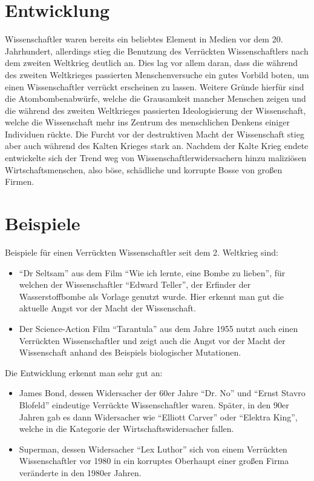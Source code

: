 \documentclass[12pt]{scrreprt}
\begin{document}
{\section{Entwicklung}
	\label{sec:entwicklung}
Wissenschaftler waren bereits ein beliebtes Element in Medien vor dem 20. Jahrhundert, allerdings stieg die Benutzung des Verrückten Wissenschaftlers nach dem zweiten Weltkrieg deutlich an.
Dies lag vor allem daran, dass die während des zweiten Weltkrieges passierten Menschenversuche ein gutes Vorbild boten, um einen Wissenschaftler verrückt erscheinen zu lassen.
Weitere Gründe hierfür sind die Atombombenabwürfe, welche die Grausamkeit mancher Menschen zeigen und die während des zweiten Weltkrieges passierten Ideologisierung der Wissenschaft, welche die Wissenschaft mehr ins Zentrum des menschlichen Denkens einiger Individuen rückte.
Die Furcht vor der destruktiven Macht der Wissenschaft stieg aber auch während des Kalten Krieges stark an.
Nachdem der Kalte Krieg endete entwickelte sich der Trend weg von Wissenschaftlerwidersachern hinzu maliziösen Wirtschaftsmenschen, also böse, schädliche und korrupte Bosse von großen Firmen.
\section{Beispiele}
	\label{sec:beispiele}
Beispiele für einen Verrückten Wissenschaftler seit dem 2. Weltkrieg sind:
\begin{itemize}
	\item \enquote{Dr Seltsam} aus dem Film \enquote{Wie ich lernte, eine Bombe zu lieben}, für welchen der Wissenschaftler \enquote{Edward Teller}, der Erfinder der Wasserstoffbombe als Vorlage genutzt wurde. Hier erkennt man gut die aktuelle Angst vor der Macht der Wissenschaft.
	\item Der Science-Action Film \enquote{Tarantula} aus dem Jahre 1955 nutzt auch einen Verrückten Wissenschaftler und zeigt auch die Angst vor der Macht der Wissenschaft anhand des Beispiels biologischer Mutationen.
\end{itemize}
Die Entwicklung erkennt man sehr gut an:
\begin{itemize}
	\item James Bond, dessen Widersacher der 60er Jahre \enquote{Dr. No} und \enquote{Ernst Stavro Blofeld} eindeutige Verrückte Wissenschaftler waren. Später, in den 90er Jahren gab es dann Widersacher wie \enquote{Elliott Carver} oder \enquote{Elektra King}, welche in die Kategorie der Wirtschaftswidersacher fallen.
	\item Superman, dessen Widersacher \enquote{Lex Luthor} sich von einem Verrückten Wissenschaftler vor 1980 in ein korruptes Oberhaupt einer großen Firma veränderte in den 1980er Jahren.
\end{itemize} 

}
\end{document}
